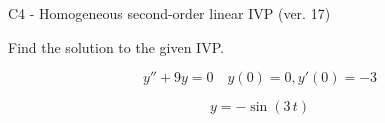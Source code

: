 \begin{exercise}
  \begin{exerciseTitle}C4 - Homogeneous second-order linear IVP (ver. 17)\end{exerciseTitle}
  \begin{exerciseStatement}
    
Find the solution to the given IVP.

    
\[y''+9y = 0 \hspace{1em} y(0) = 0 , y'(0) = -3\]

  \end{exerciseStatement}
  \begin{exerciseAnswer}
    
\[y= -\sin\left(3 \, t\right)\]

  \end{exerciseAnswer}
\end{exercise}